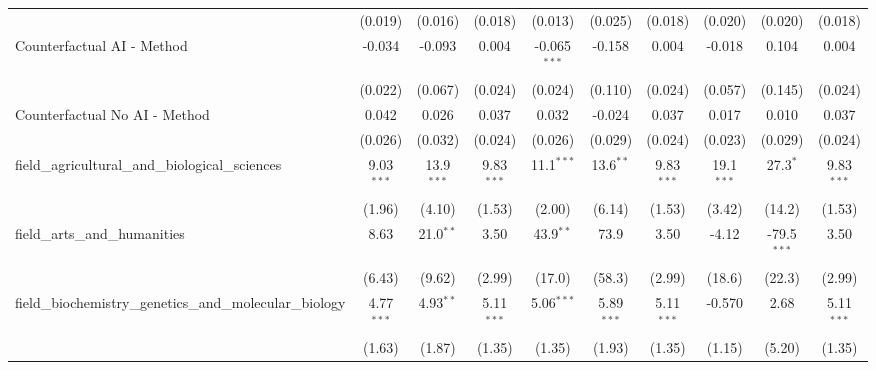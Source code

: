 \begin{tabular}{lccccccccc}
                                                               & (0.019)       & (0.016)       & (0.018)       & (0.013)        & (0.025)        & (0.018)       & (0.020)       & (0.020)       & (0.018)\\   
   Counterfactual AI - Method                                  & -0.034        & -0.093        & 0.004         & -0.065$^{***}$ & -0.158         & 0.004         & -0.018        & 0.104         & 0.004\\   
                                                               & (0.022)       & (0.067)       & (0.024)       & (0.024)        & (0.110)        & (0.024)       & (0.057)       & (0.145)       & (0.024)\\   
   Counterfactual No AI - Method                               & 0.042         & 0.026         & 0.037         & 0.032          & -0.024         & 0.037         & 0.017         & 0.010         & 0.037\\   
                                                               & (0.026)       & (0.032)       & (0.024)       & (0.026)        & (0.029)        & (0.024)       & (0.023)       & (0.029)       & (0.024)\\   
   field\_agricultural\_and\_biological\_sciences              & 9.03$^{***}$  & 13.9$^{***}$  & 9.83$^{***}$  & 11.1$^{***}$   & 13.6$^{**}$    & 9.83$^{***}$  & 19.1$^{***}$  & 27.3$^{*}$    & 9.83$^{***}$\\   
                                                               & (1.96)        & (4.10)        & (1.53)        & (2.00)         & (6.14)         & (1.53)        & (3.42)        & (14.2)        & (1.53)\\   
   field\_arts\_and\_humanities                                & 8.63          & 21.0$^{**}$   & 3.50          & 43.9$^{**}$    & 73.9           & 3.50          & -4.12         & -79.5$^{***}$ & 3.50\\   
                                                               & (6.43)        & (9.62)        & (2.99)        & (17.0)         & (58.3)         & (2.99)        & (18.6)        & (22.3)        & (2.99)\\   
   field\_biochemistry\_genetics\_and\_molecular\_biology      & 4.77$^{***}$  & 4.93$^{**}$   & 5.11$^{***}$  & 5.06$^{***}$   & 5.89$^{***}$   & 5.11$^{***}$  & -0.570        & 2.68          & 5.11$^{***}$\\   
                                                               & (1.63)        & (1.87)        & (1.35)        & (1.35)         & (1.93)         & (1.35)        & (1.15)        & (5.20)        & (1.35)\\   

\end{tabular}
